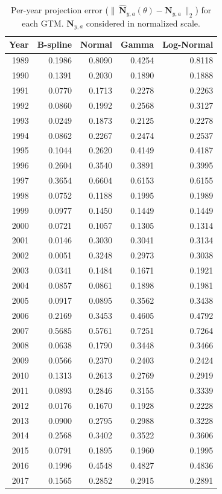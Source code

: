 \begin{table}
\centering
\footnotesize
\caption{Per-year projection error ($\bigl\| \, \widehat{\mathbf N}_{y,a}(\theta) - \mathbf N_{y,a} \, \bigr\|_2$) for each GTM. $\mathbf N_{y,a}$ considered in normalized scale.}
\label{tab:gtm-errors}
\begin{tabular}{r | r r r r}
\toprule
Year & B-spline & Normal & Gamma & Log-Normal \\
\midrule
1989 & 0.1986 & 0.8090 & 0.4254 & 0.8118 \\
1990 & 0.1391 & 0.2030 & 0.1890 & 0.1888 \\
1991 & 0.0770 & 0.1713 & 0.2278 & 0.2263 \\
1992 & 0.0860 & 0.1992 & 0.2568 & 0.3127 \\
1993 & 0.0249 & 0.1873 & 0.2125 & 0.2278 \\
1994 & 0.0862 & 0.2267 & 0.2474 & 0.2537 \\
1995 & 0.1044 & 0.2620 & 0.4149 & 0.4187 \\
1996 & 0.2604 & 0.3540 & 0.3891 & 0.3995 \\
1997 & 0.3654 & 0.6604 & 0.6153 & 0.6155 \\
1998 & 0.0752 & 0.1188 & 0.1995 & 0.1989 \\
1999 & 0.0977 & 0.1450 & 0.1449 & 0.1449 \\
2000 & 0.0721 & 0.1057 & 0.1305 & 0.1314 \\
2001 & 0.0146 & 0.3030 & 0.3041 & 0.3134 \\
2002 & 0.0051 & 0.3248 & 0.2973 & 0.3038 \\
2003 & 0.0341 & 0.1484 & 0.1671 & 0.1921 \\
2004 & 0.0857 & 0.0861 & 0.1898 & 0.1981 \\
2005 & 0.0917 & 0.0895 & 0.3562 & 0.3438 \\
2006 & 0.2169 & 0.3453 & 0.4605 & 0.4792 \\
2007 & 0.5685 & 0.5761 & 0.7251 & 0.7264 \\
2008 & 0.0638 & 0.1790 & 0.3448 & 0.3466 \\
2009 & 0.0566 & 0.2370 & 0.2403 & 0.2424 \\
2010 & 0.1313 & 0.2613 & 0.2769 & 0.2919 \\
2011 & 0.0893 & 0.2846 & 0.3155 & 0.3339 \\
2012 & 0.0176 & 0.1670 & 0.1928 & 0.2228 \\
2013 & 0.0900 & 0.2795 & 0.2988 & 0.3228 \\
2014 & 0.2568 & 0.3402 & 0.3522 & 0.3606 \\
2015 & 0.0791 & 0.1895 & 0.1960 & 0.1995 \\
2016 & 0.1996 & 0.4548 & 0.4827 & 0.4836 \\
2017 & 0.1565 & 0.2852 & 0.2915 & 0.2891 \\
\bottomrule
\end{tabular}
\end{table}
